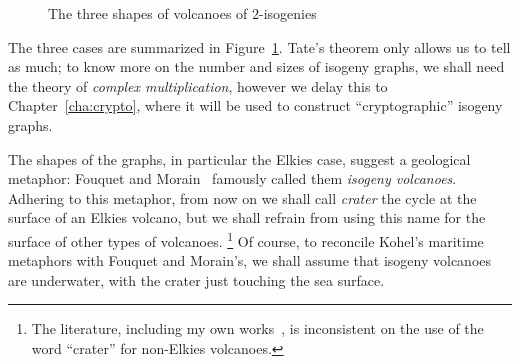 \documentclass{report}
\theoremstyle{plain}
\theoremstyle{definition}
\begin{document}
\begin{figure}[h]
  \centering
  \caption{The three shapes of volcanoes of $2$-isogenies }
  \label{fig:volcanology}
\end{figure}

The three cases are summarized in Figure~\ref{fig:volcanology}. %
Tate's theorem only allows us to tell as much; to know more on the
number and sizes of isogeny graphs, we shall need the theory of
\emph{complex multiplication}, however we delay this to
Chapter~\ref{cha:crypto}, where it will be used to construct
``cryptographic'' isogeny graphs. %

The shapes of the graphs, in particular the Elkies case, suggest a
geological metaphor: Fouquet and Morain~\cite{fouquet+morain02}
famously called them \emph{isogeny volcanoes}. %
Adhering to this metaphor, from now on we shall call \emph{crater} the
cycle at the surface of an Elkies volcano, but we shall refrain from
using this name for the surface of other types of volcanoes.%
\footnote{The literature, including my own
  works~\cite{defeo2016explicit}, is inconsistent on the use of the
  word ``crater'' for non-Elkies volcanoes.} %
Of course, to reconcile Kohel's maritime metaphors with Fouquet and
Morain's, we shall assume that isogeny volcanoes are underwater, with
the crater just touching the sea surface.
\end{document}
